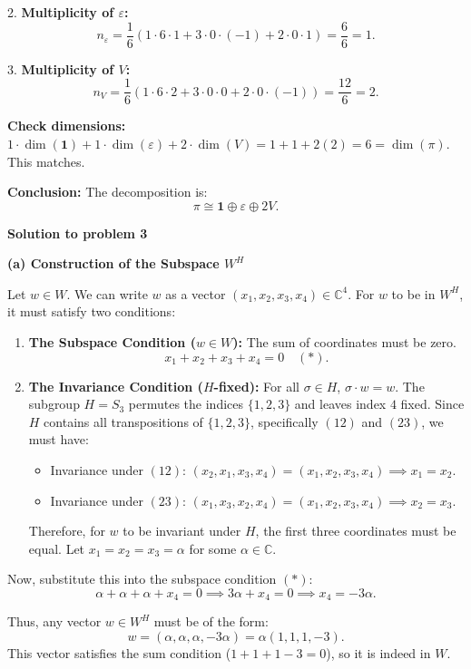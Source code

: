 \documentclass{article}
\begin{document}
2. \textbf{Multiplicity of $\varepsilon$:}
\[ n_{\varepsilon} = \frac{1}{6} (1 \cdot 6 \cdot 1 + 3 \cdot 0 \cdot (-1) + 2 \cdot 0 \cdot 1) = \frac{6}{6} = 1. \]

3. \textbf{Multiplicity of $V$:}
\[ n_{V} = \frac{1}{6} (1 \cdot 6 \cdot 2 + 3 \cdot 0 \cdot 0 + 2 \cdot 0 \cdot (-1)) = \frac{12}{6} = 2. \]

\textbf{Check dimensions:} $1 \cdot \dim(\mathbf{1}) + 1 \cdot \dim(\varepsilon) + 2 \cdot \dim(V) = 1 + 1 + 2(2) = 6 = \dim(\pi)$. This matches.

\textbf{Conclusion:} The decomposition is:
\[ \pi \cong \mathbf{1} \oplus \varepsilon \oplus 2V. \]

\hrulefill

\textbf{Solution to problem 3}

\textbf{(a) Construction of the Subspace $W^H$}

Let $w \in W$. We can write $w$ as a vector $(x_1, x_2, x_3, x_4) \in \mathbb{C}^4$.
For $w$ to be in $W^H$, it must satisfy two conditions:
\begin{enumerate}
    \item \textbf{The Subspace Condition ($w \in W$):} The sum of coordinates must be zero.
    \[ x_1 + x_2 + x_3 + x_4 = 0 \quad (*). \]
    
    \item \textbf{The Invariance Condition ($H$-fixed):} For all $\sigma \in H$, $\sigma \cdot w = w$.
    The subgroup $H = S_3$ permutes the indices $\{1, 2, 3\}$ and leaves index $4$ fixed.
    Since $H$ contains all transpositions of $\{1, 2, 3\}$, specifically $(12)$ and $(23)$, we must have:
    \begin{itemize}
        \item Invariance under $(12)$: $(x_2, x_1, x_3, x_4) = (x_1, x_2, x_3, x_4) \implies x_1 = x_2$.
        \item Invariance under $(23)$: $(x_1, x_3, x_2, x_4) = (x_1, x_2, x_3, x_4) \implies x_2 = x_3$.
    \end{itemize}
    Therefore, for $w$ to be invariant under $H$, the first three coordinates must be equal. Let $x_1 = x_2 = x_3 = \alpha$ for some $\alpha \in \mathbb{C}$.
\end{enumerate}

Now, substitute this into the subspace condition $(*)$:
\[ \alpha + \alpha + \alpha + x_4 = 0 \implies 3\alpha + x_4 = 0 \implies x_4 = -3\alpha. \]

Thus, any vector $w \in W^H$ must be of the form:
\[ w = (\alpha, \alpha, \alpha, -3\alpha) = \alpha(1, 1, 1, -3). \]
This vector satisfies the sum condition ($1+1+1-3=0$), so it is indeed in $W$.
\end{document}
